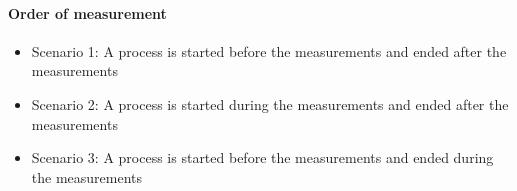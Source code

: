 
\paragraph{Order of measurement}

\begin{itemize}
    \item Scenario 1: A process is started before the measurements and ended after the measurements
    \item Scenario 2: A process is started during the measurements and ended after the measurements
    \item Scenario 3: A process is started before the measurements and ended during the measurements
\end{itemize}

